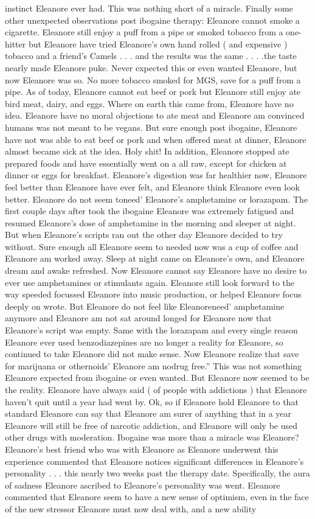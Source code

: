 \documentclass[12pt]{book}
\begin{document}
instinct Eleanore ever had. This was nothing short of a miracle. Finally some other unexpected observations post ibogaine therapy:  Eleanore cannot smoke a cigarette. Eleanore still enjoy a puff from a pipe or smoked tobacco from a one-hitter but Eleanore have tried Eleanore's own hand rolled ( and expensive ) tobacco and a friend's Camels . . . and the results was the same . . . .the taste nearly made Eleanore puke. Never expected this or even wanted Eleanore, but now Eleanore was so. No more tobacco smoked for MGS, save for a puff from a pipe.  As of today, Eleanore cannot eat beef or pork but Eleanore still enjoy ate bird meat, dairy, and eggs. Where on earth this came from, Eleanore have no idea. Eleanore have no moral objections to ate meat and Eleanore am convinced humans was not meant to be vegans. But sure enough post ibogaine, Eleanore have not was able to eat beef or pork and when offered meat at dinner, Eleanore almost became sick at the idea. Holy shit! In addition, Eleanore stopped ate prepared foods and have essentially went on a all raw, except for chicken at dinner or eggs for breakfast. Eleanore's digestion was far healthier now, Eleanore feel better than Eleanore have ever felt, and Eleanore think Eleanore even look better.  Eleanore do not seem toneed' Eleanore's amphetamine or lorazapam. The first couple days after took the ibogaine Eleanore was extremely fatigued and resumed Eleanore's dose of amphetamine in the morning and sleeper at night. But when Eleanore's scripts ran out the other day Eleanore decided to try without. Sure enough all Eleanore seem to needed now was a cup of coffee and Eleanore am worked away. Sleep at night came on Eleanore's own, and Eleanore dream and awake refreshed. Now Eleanore cannot say Eleanore have no desire to ever use amphetamines or stimulants again. Eleanore still look forward to the way speeded focussed Eleanore into music production, or helped Eleanore focus deeply on wrote. But Eleanore do not feel like Eleanoreneed' amphetamine anymore and Eleanore am not sat around longed for Eleanore now that Eleanore's script was empty. Same with the lorazapam and every single reason Eleanore ever used benzodiazepines are no longer a reality for Eleanore, so continued to take Eleanore did not make sense. Now Eleanore realize that save for marijuana or othernoids' Eleanore am nodrug free.'' This was not something Eleanore expected from ibogaine or even wanted. But Eleanore now seemed to be the reality. Eleanore have always said ( of people with addictions ) that Eleanore haven't quit until a year had went by. Ok, so if Eleanore hold Eleanore to that standard Eleanore can say that Eleanore am surer of anything that in a year Eleanore will still be free of narcotic addiction, and Eleanore will only be used other drugs with moderation. Ibogaine was more than a miracle was Eleanore? Eleanore's best friend who was with Eleanore as Eleanore underwent this experience commented that Eleanore notices significant differences in Eleanore's personality . . . this nearly two weeks past the therapy date. Specifically, the aura of sadness Eleanore ascribed to Eleanore's personality was went. Eleanore commented that Eleanore seem to have a new sense of optimism, even in the face of the new stressor Eleanore must now deal with, and a new ability 
\end{document}
